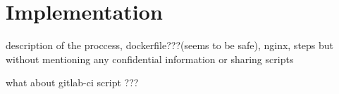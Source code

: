\section{Implementation}
description of the proccess, dockerfile???(seems to be safe), nginx,
steps but without mentioning any  confidential information or sharing scripts 

what about gitlab-ci script ??? 